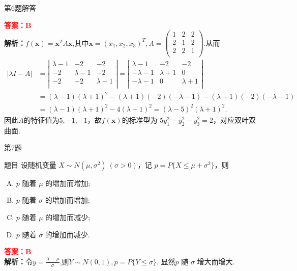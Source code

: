 \documentclass[aspectratio=169]{beamer}
\begin{document}
\begin{frame}{第6题解答}
\begin{block}{}
\textcolor{red}{\textbf{答案：}$\mathbf{B}$} \\
\textbf{解析：}$f\left( \boldsymbol{x} \right) =\boldsymbol{x}^TA\boldsymbol{x}$,其中$\boldsymbol{x}=(x_1,x_2,x_3)^T,A=\left( \begin{matrix}
1&		2&		2\\
2&		1&		2\\
2&		2&		1\\
\end{matrix} \right) $.从而
\begin{align*}
\left| \lambda I-A \right|&=\left| \begin{matrix}
\lambda -1&		-2&		-2\\
-2&		\lambda -1&		-2\\
-2&		-2&		\lambda -1\\
\end{matrix} \right|=\left| \begin{matrix}
\lambda -1&		-2&		-2\\
-\lambda -1&		\lambda +1&		0\\
-\lambda -1&		0&		\lambda +1\\
\end{matrix} \right|
\\
&=\left( \lambda -1 \right) \left( \lambda +1 \right) ^2-\left( \lambda +1 \right) \left( -2 \right) \left( -\lambda -1 \right) -\left( \lambda +1 \right) \left( -2 \right) \left( -\lambda -1 \right) 
\\
&=\left( \lambda -1 \right) \left( \lambda +1 \right) ^2-4\left( \lambda +1 \right) ^2=\left( \lambda -5 \right) ^2\left( \lambda +1 \right) ^2.
\end{align*}
因此$A$的特征值为$5,-1,-1$，故$f\left( \boldsymbol{x} \right)$的标准型为 $5y_1^2-y_2^2-y_3^2=2$，对应双叶双曲面.
\end{block}
\end{frame}

\begin{frame}{第7题}
\begin{block}{题目}
设随机变量 \(X \sim N(\mu, \sigma^{2})\ (\sigma>0)\)，记 \(p=P\{X \leqslant \mu+\sigma^{2}\}\)，则
\begin{enumerate}[A.]
\item \(p\) 随着 \(\mu\) 的增加而增加;
\item \(p\) 随着 \(\sigma\) 的增加而增加;
\item \(p\) 随着 \(\mu\) 的增加而减少;
\item \(p\) 随着 \(\sigma\) 的增加而减少.
\end{enumerate}
\textcolor{red}{\textbf{答案：}$\mathbf{B}$} \\
\textbf{解析：}令$y=\frac{X-\mu}{\sigma}$,则$Y\sim N(0,1),p=P\{Y\leqslant \sigma\}$.
显然$p$ 随 $\sigma$ 增大而增大.
\end{block}
\end{frame}
\end{document}
